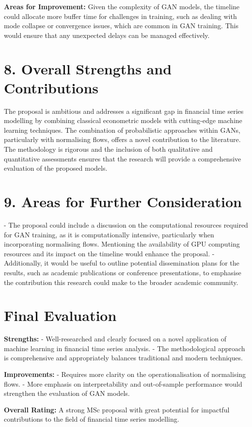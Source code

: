 \documentclass[a4paper,12pt]{article}
\begin{document}
\textbf{Areas for Improvement:}  
Given the complexity of GAN models, the timeline could allocate more buffer time for challenges in training, such as dealing with mode collapse or convergence issues, which are common in GAN training. This would ensure that any unexpected delays can be managed effectively.

\section*{8. Overall Strengths and Contributions}

The proposal is ambitious and addresses a significant gap in financial time series modelling by combining classical econometric models with cutting-edge machine learning techniques. The combination of probabilistic approaches within GANs, particularly with normalising flows, offers a novel contribution to the literature. The methodology is rigorous and the inclusion of both qualitative and quantitative assessments ensures that the research will provide a comprehensive evaluation of the proposed models.

\section*{9. Areas for Further Consideration}

- The proposal could include a discussion on the computational resources required for GAN training, as it is computationally intensive, particularly when incorporating normalising flows. Mentioning the availability of GPU computing resources and its impact on the timeline would enhance the proposal.
- Additionally, it would be useful to outline potential dissemination plans for the results, such as academic publications or conference presentations, to emphasise the contribution this research could make to the broader academic community.

\section*{Final Evaluation}

\textbf{Strengths:}
- Well-researched and clearly focused on a novel application of machine learning in financial time series analysis.
- The methodological approach is comprehensive and appropriately balances traditional and modern techniques.

\textbf{Improvements:}
- Requires more clarity on the operationalisation of normalising flows.
- More emphasis on interpretability and out-of-sample performance would strengthen the evaluation of GAN models.

\textbf{Overall Rating:} A strong MSc proposal with great potential for impactful contributions to the field of financial time series modelling.
\end{document}
